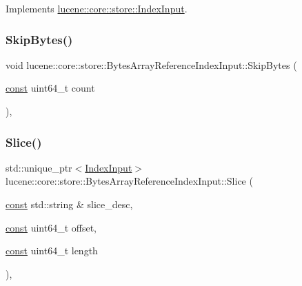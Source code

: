 Implements \mbox{\hyperlink{classlucene_1_1core_1_1store_1_1IndexInput_ad0eecec90fbbcfe46f881d75105a6046}{lucene\+::core\+::store\+::\+Index\+Input}}.

\mbox{\label{classlucene_1_1core_1_1store_1_1BytesArrayReferenceIndexInput_a4184f98a59e69b523418e121188fac93}} 
\subsubsection{\texorpdfstring{Skip\+Bytes()}{SkipBytes()}}
{\footnotesize\ttfamily void lucene\+::core\+::store\+::\+Bytes\+Array\+Reference\+Index\+Input\+::\+Skip\+Bytes (\begin{DoxyParamCaption}\item[{\mbox{\hyperlink{ZlibCrc32_8h_a2c212835823e3c54a8ab6d95c652660e}{const}} uint64\+\_\+t}]{count }\end{DoxyParamCaption})\hspace{0.3cm}{\ttfamily [inline]}, {\ttfamily [noexcept]}}

\mbox{\label{classlucene_1_1core_1_1store_1_1BytesArrayReferenceIndexInput_a6519e4407cfb07a21032fe2252870d5f}} 
\subsubsection{\texorpdfstring{Slice()}{Slice()}}
{\footnotesize\ttfamily std\+::unique\+\_\+ptr$<$\mbox{\hyperlink{classlucene_1_1core_1_1store_1_1IndexInput}{Index\+Input}}$>$ lucene\+::core\+::store\+::\+Bytes\+Array\+Reference\+Index\+Input\+::\+Slice (\begin{DoxyParamCaption}\item[{\mbox{\hyperlink{ZlibCrc32_8h_a2c212835823e3c54a8ab6d95c652660e}{const}} std\+::string \&}]{slice\+\_\+desc,  }\item[{\mbox{\hyperlink{ZlibCrc32_8h_a2c212835823e3c54a8ab6d95c652660e}{const}} uint64\+\_\+t}]{offset,  }\item[{\mbox{\hyperlink{ZlibCrc32_8h_a2c212835823e3c54a8ab6d95c652660e}{const}} uint64\+\_\+t}]{length }\end{DoxyParamCaption})\hspace{0.3cm}{\ttfamily [inline]}, {\ttfamily [virtual]}}



